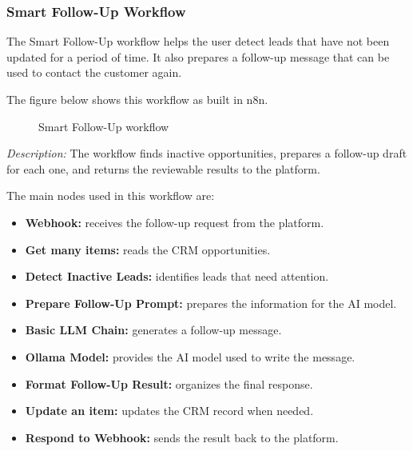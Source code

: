\documentclass[12pt,a4paper,oneside]{report}
\newcommand{\figdesc}[1]{%
\vspace{-0.05cm}\noindent\small\textit{Description:} #1\par\normalsize\vspace{0.30cm}%
}
\begin{document}
\subsubsection{Smart Follow-Up Workflow}

The Smart Follow-Up workflow helps the user detect leads that have not been updated for a period of time. It also prepares a follow-up message that can be used to contact the customer again.

The figure below shows this workflow as built in n8n.

\begin{figure}[H]
\centering
{}
\caption{Smart Follow-Up workflow}
\label{fig:smart followup workflow}
\end{figure}
\figdesc{The workflow finds inactive opportunities, prepares a follow-up draft for each one, and returns the reviewable results to the platform.}


The main nodes used in this workflow are:

\begin{itemize}
\item \textbf{Webhook:} receives the follow-up request from the platform.
\item \textbf{Get many items:} reads the CRM opportunities.
\item \textbf{Detect Inactive Leads:} identifies leads that need attention.
\item \textbf{Prepare Follow-Up Prompt:} prepares the information for the AI model.
\item \textbf{Basic LLM Chain:} generates a follow-up message.
\item \textbf{Ollama Model:} provides the AI model used to write the message.
\item \textbf{Format Follow-Up Result:} organizes the final response.
\item \textbf{Update an item:} updates the CRM record when needed.
\item \textbf{Respond to Webhook:} sends the result back to the platform.
\end{itemize}
\end{document}
